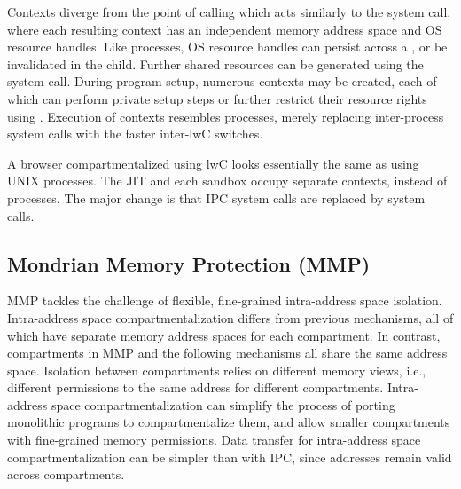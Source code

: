 Contexts diverge from the point of calling  which acts similarly
to the  system call, where each resulting context has an 
independent memory address space and OS resource handles.
Like processes, OS resource handles can persist across a , or be
invalidated in the child.
Further shared resources can be generated using the  system 
call.
During program setup, numerous contexts may be created, each of which can
perform private setup steps or further restrict their resource rights using
.
Execution of contexts resembles processes, merely replacing inter-process system
calls with the faster inter-lwC switches.

A browser compartmentalized using lwC looks essentially the same as
using UNIX processes. 
The JIT and each sandbox occupy separate contexts, instead of processes.
The major change is that IPC system calls are replaced by 
system calls.

\subsection{Mondrian Memory Protection (MMP)}
MMP tackles the challenge of flexible, fine-grained intra-address space 
isolation.
Intra-address space compartmentalization differs from previous mechanisms,
all of which have separate memory address spaces for each compartment.
In contrast, compartments in MMP and the following mechanisms all share the
same address space.
Isolation between compartments relies on different 
memory views, i.e., different permissions to the same address for 
different compartments.
Intra-address space compartmentalization can simplify the process of
porting monolithic programs to compartmentalize them, and allow
smaller compartments with fine-grained memory permissions.
Data transfer for intra-address space compartmentalization can be simpler
than with IPC, since addresses remain valid across compartments.

